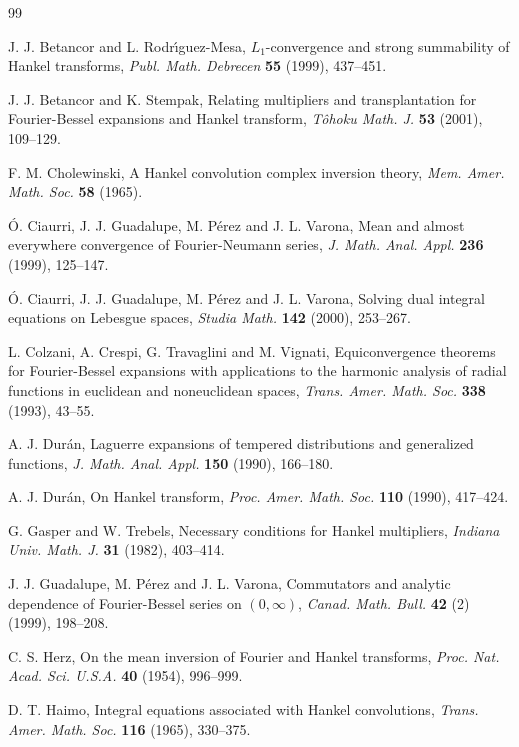 \documentclass{amsart}
\theoremstyle{remark}
\begin{document}
\begin{thebibliography}{99}

 J. J. Betancor and L. Rodr\'{\i}guez-Mesa,
$L_1$-convergence and strong summability of Hankel transforms,
\textit{Publ. Math. Debrecen}
\textbf{55} (1999), 437--451.

 J. J. Betancor and K. Stempak,
Relating multipliers and transplantation for Fourier-Bessel expansions and
Hankel transform,
\textit{T\^ohoku Math. J.}
\textbf{53} (2001), 109--129.

 F. M. Cholewinski,
A Hankel convolution complex inversion theory, 
\textit{Mem. Amer. Math. Soc.}
\textbf{58} (1965).

 \'O. Ciaurri, J. J. Guadalupe, M. P\'erez and J. L. Varona,
{Mean and almost everywhere convergence of Fourier-Neumann series},
\textit{J. Math. Anal. Appl.}
\textbf{236} (1999), 125--147.

 \'O. Ciaurri, J. J. Guadalupe, M. P\'erez and J. L. Varona,
{Solving dual integral equations on Lebesgue spaces},
\textit{Studia Math.}
\textbf{142} (2000), 253--267.

 L. Colzani, A. Crespi, G. Travaglini and M. Vignati,
{Equiconvergence theorems for Fourier-Bessel expansions with applications to
the harmonic analysis of radial functions in euclidean and noneuclidean
spaces},
\textit{Trans. Amer. Math. Soc.}
\textbf{338} (1993), 43--55.

 A. J. Dur\'an,
{Laguerre expansions of tempered distributions and generalized functions},
\textit{J. Math. Anal. Appl.}
\textbf{150} (1990), 166--180.

 A. J. Dur\'an,
{On Hankel transform},
\textit{Proc. Amer. Math. Soc.}
\textbf{110} (1990), 417--424.

 G. Gasper and W. Trebels,
{Necessary conditions for Hankel multipliers},
\textit{Indiana Univ. Math. J.}
\textbf{31} (1982), 403--414.

 J. J. Guadalupe, M. P\'erez and J. L. Varona,
{Commutators and analytic dependence of Fourier-Bessel series on $(0,\infty)$},
\textit{Canad. Math. Bull.}
\textbf{42} (2) (1999), 198--208.

 C. S. Herz,
{On the mean inversion of Fourier and Hankel transforms},
\textit{Proc. Nat. Acad. Sci. U.S.A.}
\textbf{40} (1954), 996--999.

 D. T. Haimo,
{Integral equations associated with Hankel convolutions},
\textit{Trans. Amer. Math. Soc.}
\textbf{116} (1965), 330--375. 


\end{thebibliography}
\end{document}
